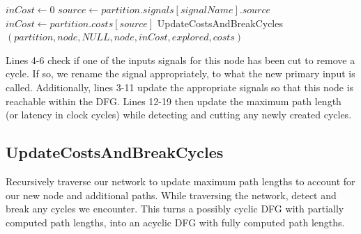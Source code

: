 \documentclass[12pt,final,oneside]{article} %
\begin{document}
\begin{algorithm}
\begin{algorithmic}[1]
            \State $inCost \gets 0$
               \State $source \gets partition.signals[signalName].source$
                  \State $inCost \gets partition.costs[source]$
               \EndIf
            \EndFor
            \State UpdateCostsAndBreakCycles$(partition, node, NULL, node, inCost, explored, costs)$
         \EndProcedure
   \end{algorithmic}
\end{algorithm}
Lines 4-6 check if one of the inputs signals for this node has been cut to remove a cycle. If so, we rename the signal appropriately, to what the new primary input is called.
Additionally, lines 3-11 update the appropriate signals so that this node is reachable within the \ac{DFG}.
Lines 12-19 then update the maximum path length (or latency in clock cycles) while detecting and cutting any newly created cycles.


\newpage
\subsection{UpdateCostsAndBreakCycles}
Recursively traverse our network to update maximum path lengths to account for our new node and additional paths. While traversing the network, detect and break any cycles we encounter.
This turns a possibly cyclic \ac{DFG} with partially computed path lengths, into an acyclic \ac{DFG} with fully computed path lengths.
\end{document}
